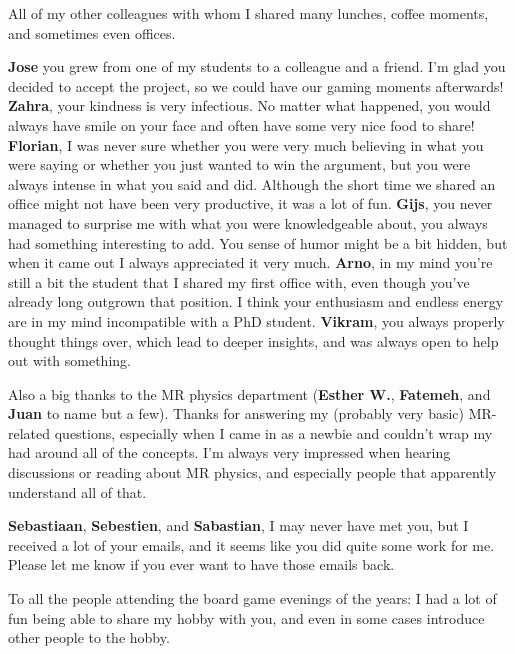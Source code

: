 All of my other colleagues with whom I shared many lunches, coffee moments, and sometimes even offices.

\textbf{Jose} you grew from one of my students to a colleague and a friend.
I'm glad you decided to accept the project, so we could have our gaming moments afterwards!
\textbf{Zahra}, your kindness is very infectious.
No matter what happened, you would always have smile on your face and often have some very nice food to share!
\textbf{Florian}, I was never sure whether you were very much believing in what you were saying or whether you just wanted to win the argument, but you were always intense in what you said and did.
Although the short time we shared an office might not have been very productive, it was a lot of fun.
\textbf{Gijs}, you never managed to surprise me with what you were knowledgeable about, you always had something interesting to add.
You sense of humor might be a bit hidden, but when it came out I always appreciated it very much.
\textbf{Arno}, in my mind you're still a bit the student that I shared my first office with, even though you've already long outgrown that position.
I think your enthusiasm and endless energy are in my mind incompatible with a PhD student.
\textbf{Vikram}, you always properly thought things over, which lead to deeper insights, and was always open to help out with something.

Also a big thanks to the MR physics department (\textbf{Esther W.}, \textbf{Fatemeh}, and \textbf{Juan} to name but a few).
Thanks for answering my (probably very basic) MR-related questions, especially when I came in as a newbie and couldn't wrap my had around all of the concepts.
I'm always very impressed when hearing discussions or reading about MR physics, and especially people that apparently understand all of that.

\textbf{Sebastiaan}, \textbf{Sebestien}, and \textbf{Sabastian}, I may never have met you, but I received a lot of your emails, and it seems like you did quite some work for me.
Please let me know if you ever want to have those emails back.

To all the people attending the board game evenings of the years: I had a lot of fun being able to share my hobby with you, and even in some cases introduce other people to the hobby.

